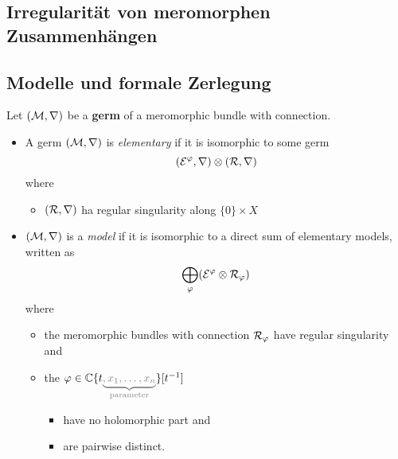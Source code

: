 \subsection{Irregularität von meromorphen Zusammenhängen} %
\TODO
\subsection{Modelle und formale Zerlegung}%
\begin{defn}
  Let $(\mathcal{M},\nabla)$ be a \textbf{germ} of a meromorphic bundle with
  connection.
  \begin{itemize}
    \item A germ $(\mathcal{M},\nabla)$ is \emph{elementary} if it is isomorphic to
      some germ
      \[
        (\mathcal{E}^\varphi,\nabla)\otimes(\mathcal{R},\nabla)
      \]
      where
      \begin{itemize}
        \item $(\mathcal{R},\nabla)$ ha regular singularity along $\{0\}\times X$
      \end{itemize}
    \item $(\mathcal{M},\nabla)$ is a \emph{model} if it is isomorphic to a direct sum
      of elementary models, written as
      \[
        \bigoplus_\varphi(\mathcal{E}^\varphi\otimes\mathcal{R}_\varphi)
      \]
      where
      \begin{itemize}
        \item the meromorphic bundles with connection $\mathcal{R}_\varphi$ have regular
          singularity and
        \item the
          $\phi\in\C\{t\textcolor{gray}{\underset{\text{parameter}}
            {\underbrace{,x_1,\ldots,x_n}}}\}[t^{-1}]$
          \begin{itemize}
            \item have no holomorphic part and
            \item are pairwise distinct.
          \end{itemize}
      \end{itemize}
  \end{itemize}
  \begin{comment}
    \begin{itemize}
      \item We will say that a model is \emph{good} if,
        \begin{itemize}
          \item for all $\phi\neq\psi$
            \begin{itemize}
              \item such that $\cR_\phi$, $\cR_\psi$ are nonzero,
            \end{itemize}
            the order of the pole along $t=0$ of $(\phi-\psi)(t,x)$ does not
            depend on $x$ being in some neighbourhood of $x^o$.
        \end{itemize}
    \end{itemize}
  \end{comment}
\end{defn}

